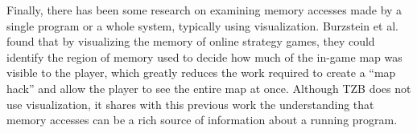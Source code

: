 Finally, there has been some research on examining memory accesses made
by a single program or a whole system, typically using visualization.
Burzstein et al.~\cite{Bursztein:2011fk} found that by visualizing
the memory of online strategy games, they could identify the region of
memory used to decide how much of the in-game map was visible to the
player, which greatly reduces the work required to create a ``map hack''
and allow the player to see the entire map at once. Although TZB does
not use visualization, it shares with this previous work the
understanding that memory accesses can be a rich source of information
about a running program.
